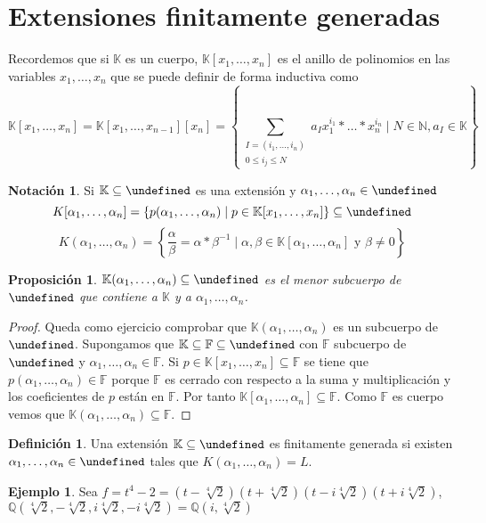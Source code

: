 \documentclass[10pt, spanish]{report}
\newtheorem*{prop}{Proposición}
\theoremstyle{definition}
\newtheorem*{defin}{Definición}
\newtheorem*{notacion}{Notación}
\newtheorem*{ej}{Ejemplo}
\newcommand{\N}{\mathbb{N}}
\newcommand{\Q}{\mathbb{Q}}
\newcommand{\F}{\mathbb{F}}
\newcommand{\K}{\mathbb{K}}
\let\L\undefined
\newcommand{\L}{\mathbb{L}}
\renewcommand{\leq}{\leqslant}
\newcommand{\fecha}[1]{\marginpar{\underline{#1}}}
\begin{document}
\fecha{22/02}
\section{Extensiones finitamente generadas}
Recordemos que si $\K$ es un cuerpo, $\K[x_1,\ldots,x_n]$ es el anillo de
polinomios en las variables $x_1,\ldots,x_n$ que se puede definir de forma
inductiva como \[\K[x_1,\ldots,x_n]=\K[x_1,\ldots,x_{n-1}][x_n]=\left\{
\sum_{\substack{I=\left( i_1,\ldots,i_n \right)\\ 0\leq i_j\leq N }}
a_Ix_1^{i_1}*\ldots*x_n^{i_n}\mid N\in \N,a_I\in\K\right\} \]

\begin{notacion}
    Si $\K\subseteq\L$ es una extensión y $\alpha_1,\ldots,\alpha_n\in\L$
    \[K[\alpha_1,\ldots,\alpha_n]=\left\{ p(\alpha_1,\ldots,\alpha_n)\mid p\in\K[x_1,
     \ldots,x_n]\right\} \subseteq \L\]
    \[K(\alpha_1,\ldots,\alpha_n)=\left\{\frac{\alpha}{\beta}=\alpha*\beta^{-1}
     \mid \alpha,\beta\in\K[\alpha_1,\ldots,\alpha_n]\text{ y }\beta\neq0
     \right\}\]
\end{notacion}

\begin{prop}
    $\K(\alpha_1,\ldots,\alpha_n)\subseteq\L$ es el menor subcuerpo de $\L$ que
    contiene a $\K$ y a $\alpha_1,\ldots,\alpha_n$.
\end{prop}

\begin{proof}
    Queda como ejercicio comprobar que $\K(\alpha_1,\ldots,\alpha_n)$ es un
    subcuerpo de $\L$. Supongamos que $\K\subseteq\F\subseteq\L$ con $\F$
    subcuerpo de $\L$ y $\alpha_1,\ldots,\alpha_n\in\F$. Si $p\in\K[x_1,\ldots,
    x_n]\subseteq\F$ se tiene que $p(\alpha_1,\ldots,\alpha_n)\in \F$ porque
    $\F$ es cerrado con respecto a la suma y multiplicación y los coeficientes
    de $p$ están en $\F$. Por tanto $\K[\alpha_1,\ldots,\alpha_n]\subseteq\F$.
    Como $\F$ es cuerpo vemos que $\K(\alpha_1,\ldots,\alpha_n)\subseteq\F$.
\end{proof}

\begin{defin}
    Una extensión $\K\subseteq\L$ es finitamente generada si existen
    $\alpha_1,\ldots,\alpha_n\in\L$ tales que $K(\alpha_1,\ldots,\alpha_n)=L$.
\end{defin}

\begin{ej}
    Sea
    $f=t^4-2=(t-\sqrt[4]{2})(t+\sqrt[4]{2})(t-i\sqrt[4]{2})(t+i\sqrt[4]{2})$,
    $\Q(\sqrt[4]{2},-\sqrt[4]{2},i\sqrt[4]{2},-i\sqrt[4]{2})=\Q(i,\sqrt[4]{2})$
\end{ej}
\end{document}
